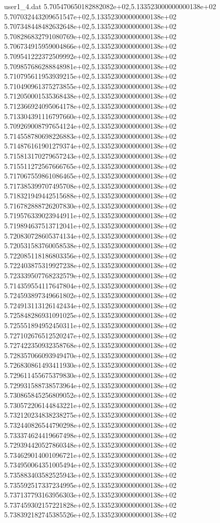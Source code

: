 \begin{filecontents}{user1_4.dat}
5.705470650182882082e+02,5.133523000000000138e+02
5.707032443209651547e+02,5.133523000000000138e+02
5.707348448482632648e+02,5.133523000000000138e+02
5.708286832791080769e+02,5.133523000000000138e+02
5.706734915959004866e+02,5.133523000000000138e+02
5.709541222372509992e+02,5.133523000000000138e+02
5.709857686288848981e+02,5.133523000000000138e+02
5.710795611953939215e+02,5.133523000000000138e+02
5.710490961375273855e+02,5.133523000000000138e+02
5.712050001535368438e+02,5.133523000000000138e+02
5.712366924095064178e+02,5.133523000000000138e+02
5.713304391116797660e+02,5.133523000000000138e+02
5.709269008797654124e+02,5.133523000000000138e+02
5.714558780698226883e+02,5.133523000000000138e+02
5.714876161901279374e+02,5.133523000000000138e+02
5.715813170279657243e+02,5.133523000000000138e+02
5.715511272567666765e+02,5.133523000000000138e+02
5.717067559861086465e+02,5.133523000000000138e+02
5.717385399707495708e+02,5.133523000000000138e+02
5.718321949442515688e+02,5.133523000000000138e+02
5.716782888726207830e+02,5.133523000000000138e+02
5.719576339023944911e+02,5.133523000000000138e+02
5.719894637513712041e+02,5.133523000000000138e+02
5.720830728605374134e+02,5.133523000000000138e+02
5.720531583760058538e+02,5.133523000000000138e+02
5.722085118186803356e+02,5.133523000000000138e+02
5.722403875319927238e+02,5.133523000000000138e+02
5.723339507768232579e+02,5.133523000000000138e+02
5.714359554117647804e+02,5.133523000000000138e+02
5.724593897349661802e+02,5.133523000000000138e+02
5.724913113126142434e+02,5.133523000000000138e+02
5.725848286931091025e+02,5.133523000000000138e+02
5.725551894952450311e+02,5.133523000000000138e+02
5.727102676512520247e+02,5.133523000000000138e+02
5.727422350932358768e+02,5.133523000000000138e+02
5.728357066093949470e+02,5.133523000000000138e+02
5.726830861493411930e+02,5.133523000000000138e+02
5.729611455675379830e+02,5.133523000000000138e+02
5.729931588738573964e+02,5.133523000000000138e+02
5.730865845256809052e+02,5.133523000000000138e+02
5.730572206144843221e+02,5.133523000000000138e+02
5.732120234838238275e+02,5.133523000000000138e+02
5.732440826544790298e+02,5.133523000000000138e+02
5.733374624419667498e+02,5.133523000000000138e+02
5.729394420527860348e+02,5.133523000000000138e+02
5.734629014001096721e+02,5.133523000000000138e+02
5.734950064351005494e+02,5.133523000000000138e+02
5.735883403582525943e+02,5.133523000000000138e+02
5.735592517337234995e+02,5.133523000000000138e+02
5.737137793163956303e+02,5.133523000000000138e+02
5.737459302157221828e+02,5.133523000000000138e+02
5.738392182745385526e+02,5.133523000000000138e+02

\end{filecontents}
